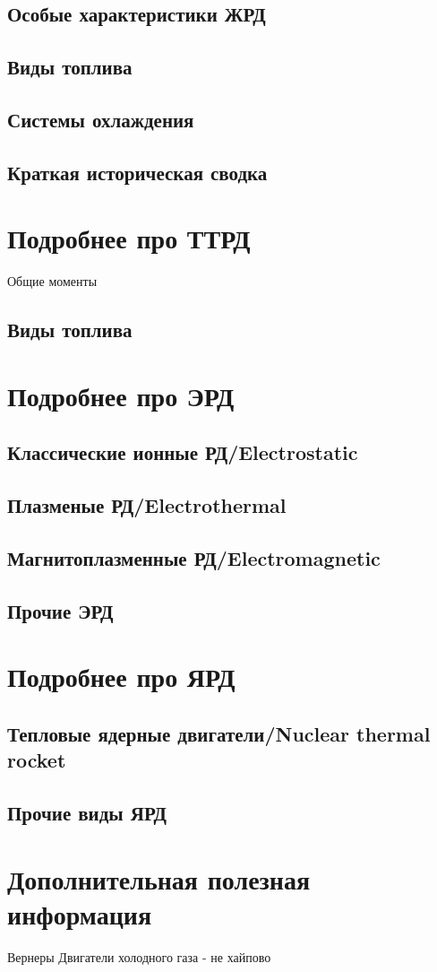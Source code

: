 \documentclass{article}
\begin{document}
\subsection{Особые характеристики ЖРД}

\subsection{Виды топлива}

\subsection{Системы охлаждения}

\subsection{Краткая историческая сводка}


\section{Подробнее про ТТРД}
Общие моменты
\subsection{Виды топлива}

\section{Подробнее про ЭРД}

\subsection{Классические ионные РД/Electrostatic}

\subsection{Плазменые РД/Electrothermal}

\subsection{Магнитоплазменные РД/Electromagnetic}

\subsection{Прочие ЭРД}


\section{Подробнее про ЯРД}

\subsection{Тепловые ядерные двигатели/Nuclear thermal rocket}

\subsection{Прочие виды ЯРД}


\section{Дополнительная полезная информация}
Вернеры
Двигатели холодного газа - не хайпово
\end{document}
